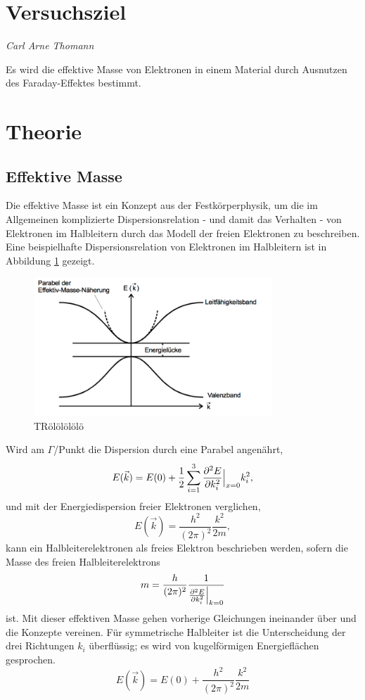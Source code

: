 \section{Versuchsziel}
{\footnotesize \textit{Carl Arne Thomann}}

Es wird die effektive Masse von Elektronen in einem Material durch Ausnutzen des Faraday-Effektes bestimmt.
\section{Theorie}
\label{sec:Theorie}
\subsection{Effektive Masse}
Die effektive Masse ist ein Konzept aus der Festkörperphysik,
um die im Allgemeinen komplizierte Dispersionsrelation - und damit das Verhalten - von Elektronen im Halbleitern
durch das Modell der freien Elektronen zu beschreiben.
Eine beispielhafte Dispersionsrelation von Elektronen im Halbleitern ist in
Abbildung \ref{fig:dispersion} gezeigt.
\begin{figure}
    \centering
    \includegraphics[width=0.8\textwidth]{graphics/dispersion.png}
    \caption{TRölölölölö \cite{skript}}
    \label{fig:dispersion}
\end{figure}
Wird am $\Gamma$\-/Punkt die Dispersion durch eine Parabel angenährt,
\begin{equation}
    E(\vec k) = E(0) + \frac{1}{2}\sum\limits_{i=1}^3 \frac{\partial^2 E}{\partial k_i^2}\Bigl|_{x=0}k_i^2,
\end{equation}
und mit der Energiedispersion freier Elektronen verglichen, %
\begin{equation}
    E(\vec k) = \frac{h^2}{(2\pi)^2}\frac{k^2}{2m},
\end{equation}
kann ein Halbleiterelektronen als freies Elektron beschrieben werden, sofern die Masse des freien Halbleiterelektrons
\begin{equation}
    m = \frac{h}{(2\pi)^2}\frac{1}{\frac{\partial^2 E}{\partial k_i^2}\Bigl|_{k=0}}
\end{equation}
ist.
Mit dieser effektiven Masse gehen vorherige Gleichungen ineinander über und die Konzepte vereinen.
Für symmetrische Halbleiter ist die Unterscheidung der drei Richtungen $k_i$ überflüssig;
es wird von kugelförmigen Energieflächen gesprochen.
\begin{equation}
    E(\vec k) = E(0) + \frac{h^2}{(2\pi)^2}\frac{k^2}{2m}
\end{equation}
